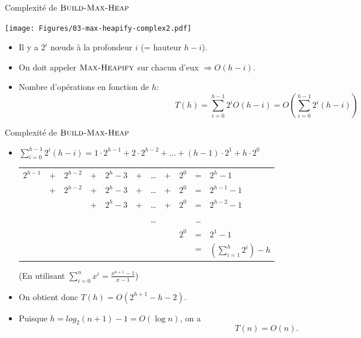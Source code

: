 \begin{frame}{Complexité de $\textnormal{\scshape Build-Max-Heap}$}
\centerline{\texttt{[image: Figures/03-max-heapify-complex2.pdf]}}

\begin{itemize}
\item Il y a $2^i$ n\oe uds à la profondeur $i$ (= hauteur $h-i$).
\item On doit appeler $\textnormal{\scshape Max-Heapify}$ sur chacun d'eux $\Rightarrow O(h-i)$.
\item Nombre d'opérations en fonction de $h$:
$$T(h)=\sum_{i=0}^{h-1} 2^i O(h-i)=O(\sum_{i=0}^{h-1} 2^i (h-i))$$
\end{itemize}
\end{frame}

\begin{frame}{Complexité de $\textnormal{\scshape Build-Max-Heap}$}
\begin{itemize}
\item $\sum_{i=0}^{h-1} 2^i (h-i)=1\cdot 2^{h-1}+2\cdot 2^{h-2}+\ldots+(h-1)\cdot 2^1+h\cdot 2^0$

\bigskip

\begin{small}
\begin{tabular}{ccccccccccl}
$2^{h-1}$ & + & $2^{h-2}$ & + & $2^h-3$ & + & \ldots & +& $2^0$ & = & $2^{h}-1$\\
 & + & $2^{h-2}$ & + & $2^h-3$ & + & \ldots & +& $2^0$ & = & $2^{h-1}-1$\\
 & & & + & $2^h-3$ & + & \ldots & +& $2^0$ & = & $2^{h-2}-1$\\
 &   &        &   &      &   & \ldots &  &    & \ldots & \\
 &   &        &   &     &    &        & & $2^0$ & = & $2^1-1$\\
\hline
 &   &        &   &     &    &        & &     & = & $\left(\sum_{i=1}^h 2^i\right)-h$
\end{tabular}
\end{small}

\medskip

(En utilisant $\sum_{i=0}^n x^i=\frac{x^{n+1}-1}{x-1}$)

\bigskip

\item On obtient donc $T(h)=O(2^{h+1}-h-2).$
\item Puisque $h=log_2(n+1)-1=O(\log n)$, on a $$T(n)=O(n).$$
\end{itemize}
\end{frame}

